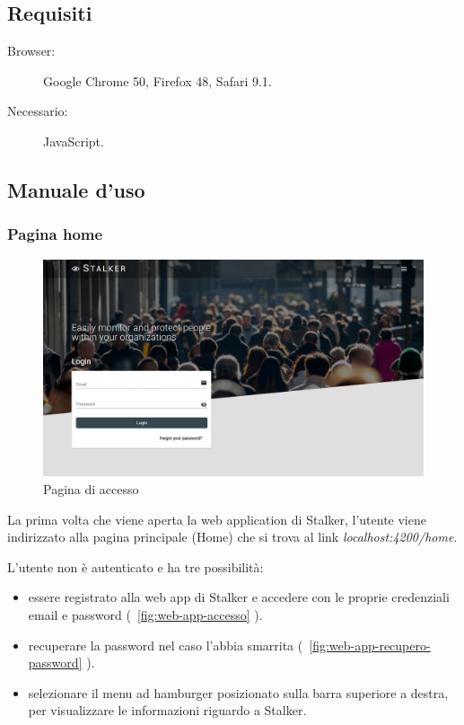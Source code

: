 \documentclass[../manuale-utente.tex]{subfiles}
\begin{document}
\subsection{Requisiti}%
\label{sub:requisiti}

\begin{description}
    \item[Browser:] Google Chrome 50, Firefox 48, Safari 9.1.
    \item[Necessario:] JavaScript.
\end{description}


\subsection{Manuale d'uso}%
\label{sub:manuale-uso-web}

\subsubsection{Pagina home}%
\label{subs:pagina-home}

\begin{figure}[H]
    \centering
    \includegraphics[width=175mm]{img/web-app/pagina-home.PNG}
    \caption{Pagina di accesso}%
    \label{fig:web-app-pagina-accesso}
\end{figure}

La prima volta che viene aperta la web application di Stalker, l'utente viene indirizzato alla pagina principale (Home) che si trova al link \textit{localhost:4200/home}.

L'utente non è autenticato e ha tre possibilità:
\begin{itemize}
    \item essere registrato alla web app di Stalker e accedere con le proprie credenziali email e password (~\ref{fig:web-app-accesso} ).
    \item recuperare la password nel caso l'abbia smarrita (~\ref{fig:web-app-recupero-password} ).
    \item selezionare il menu ad hamburger posizionato sulla barra superiore a destra, per visualizzare le informazioni riguardo a Stalker.
\end{itemize} 
\newpage
\end{document}
